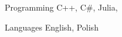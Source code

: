 
\begin{cvskills}

  \cvskill
    {Programming} %
    {C++, {C\#}, Julia, } %

  \cvskill
    {Languages} %
    {English, Polish} %

\end{cvskills}
